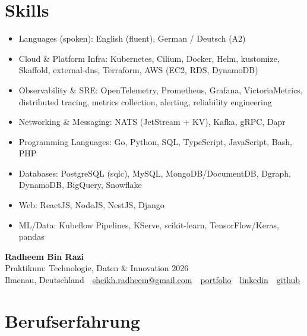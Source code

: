 \documentclass[11pt,a4paper]{resume}
\makeatletter
\newcommand{\Portfolio}{https://radheem.github.io/my-cv}
\newcommand{\PortfolioText}{portfolio}
\newcommand{\GitHub}{https://github.com/radheem}
\newcommand{\LinkedIn}{https://www.linkedin.com/in/radheem-razi}
\newcommand{\Email}{sheikh.radheem@gmail.com}
\makeatother
\begin{document}
\section{Skills}

\begin{itemize}[leftmargin=1.4em,nosep,topsep=2pt]
  \item Languages (spoken): English (fluent), German / Deutsch (A2)
  \item Cloud \& Platform Infra: Kubernetes, Cilium, Docker, Helm, kustomize, Skaffold, external-dns, Terraform, AWS (EC2, RDS, DynamoDB)
  \item Observability \& SRE: OpenTelemetry, Prometheus, Grafana, VictoriaMetrics, distributed tracing, metrics collection, alerting, reliability engineering
  \item Networking \& Messaging: NATS (JetStream + KV), Kafka, gRPC, Dapr
  \item Programming Languages: Go, Python, SQL, TypeScript, JavaScript, Bash, PHP
  \item Databases: PostgreSQL (sqlc), MySQL, MongoDB/DocumentDB, Dgraph, DynamoDB, BigQuery, Snowflake
  \item Web: ReactJS, NodeJS, NestJS, Django
  \item ML/Data: Kubeflow Pipelines, KServe, scikit-learn, TensorFlow/Keras, pandas
\end{itemize}

\clearpage
{}

\begin{center}
  {\huge\bfseries Radheem Bin Razi}\\[3pt]
  {\large Praktikum: Technologie, Daten \& Innovation 2026}\\[6pt]
  \small
  Ilmenau, Deutschland \,\textbar\,
  \href{mailto:\Email}{\Email} \,\textbar\,
  \href{\Portfolio}{\PortfolioText} \,\textbar\,
  \href{\LinkedIn}{linkedin} \,\textbar\,
  \href{\GitHub}{github}
\end{center}
\vspace{2pt}

\section{Berufserfahrung}
\end{document}
